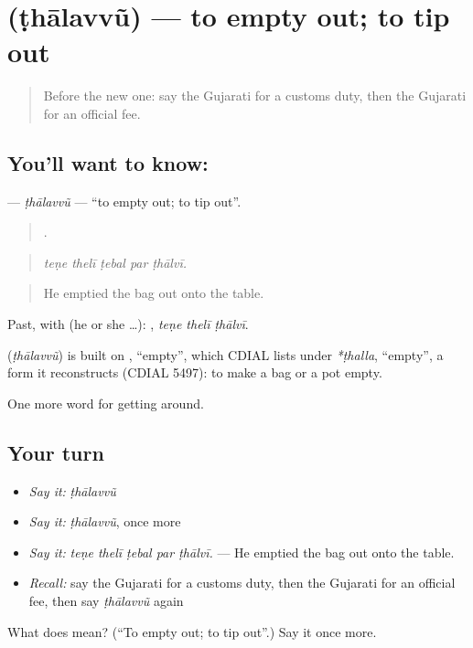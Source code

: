 \section[\texorpdfstring{\gu{ઠાલવવું} (ṭhālavvũ)}{ઠાલવવું (ṭhālavvũ)}]{ (ṭhālavvũ) — to empty out; to tip out}

\label{lesson:GU-C406-thalavvu}



\begin{quote}
Before the new one: say the Gujarati for a customs duty, then the Gujarati for an official fee.
\end{quote}

\subsection*{You'll want to know: }
\textbf{} — \emph{ṭhālavvũ} — \textquotedblleft{}to empty out; to tip out\textquotedblright{}.

\begin{quote}
    .
\end{quote}

\begin{quote}
\emph{teṇe thelī ṭebal par ṭhālvī.}
\end{quote}

\begin{quote}
He emptied the bag out onto the table.
\end{quote}

Past, with  (he or she …):   , \emph{teṇe thelī ṭhālvī}.

\begin{cousinweb}
\textbf{} (\emph{ṭhālavvũ}) is built on , \textquotedblleft{}empty\textquotedblright{}, which CDIAL lists under \emph{*ṭhalla}, \textquotedblleft{}empty\textquotedblright{}, a form it reconstructs (CDIAL 5497): to make a bag or a pot empty.
\end{cousinweb}

\begin{grammarlens}[title={What you've built}]
One more word for getting around.
\end{grammarlens}

\subsection*{Your turn}
\begin{itemize}
\raggedright
  \item \emph{Say it:} \emph{ṭhālavvũ}
  \item \emph{Say it:} \emph{ṭhālavvũ}, once more
  \item \emph{Say it:} \emph{teṇe thelī ṭebal par ṭhālvī.} — He emptied the bag out onto the table.
  \item \emph{Recall:} say the Gujarati for a customs duty, then the Gujarati for an official fee, then say \emph{ṭhālavvũ} again
\end{itemize}

\begin{tcolorbox}[breakable,colback=teal!4,colframe=teal!35!black,title={Before you move on}]
What does  mean? (\textquotedblleft{}To empty out; to tip out\textquotedblright{}.) Say it once more.
\end{tcolorbox}
